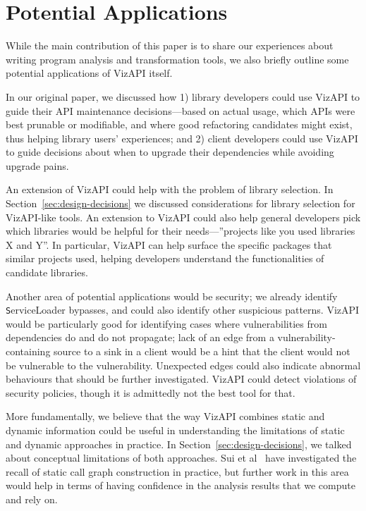 \section{Potential Applications}
\label{sec:potential-applications}
While the main contribution of this paper is to share our experiences
about writing program analysis and transformation tools, we also
briefly outline some potential applications of VizAPI itself.

In our original paper, we discussed how 1) library developers could
use VizAPI to guide their API maintenance decisions---based on actual
usage, which APIs were best prunable or modifiable, and where good
refactoring candidates might exist, thus helping library users'
experiences; and 2) client developers could use VizAPI to guide
decisions about when to upgrade their dependencies while avoiding
upgrade pains.

An extension of VizAPI could help with the problem of library selection. In
Section~\ref{sec:design-decisions} we discussed considerations for library
selection for VizAPI-like tools. An extension to VizAPI could also help
general developers pick which libraries would be helpful for their
needs---''projects like you used libraries X and Y''. In particular,
VizAPI can help surface the specific packages that similar projects used,
helping developers understand the functionalities of candidate libraries.


Another area of potential applications would be security; we already
identify {\texttt ServiceLoader} bypasses, and could also identify
other suspicious patterns. VizAPI would be particularly good for
identifying cases where vulnerabilities from dependencies do and do
not propagate; lack of an edge from a vulnerability-containing source
to a sink in a client would be a hint that the client would not be
vulnerable to the vulnerability. Unexpected edges could also indicate
abnormal behaviours that should be further investigated.
VizAPI could detect violations of
security policies, though it is admittedly not the best tool for that.

More fundamentally, we believe that the way VizAPI combines static and
dynamic information could be useful in understanding the limitations
of static and dynamic approaches in practice. In
Section~\ref{sec:design-decisions}, we talked about conceptual
limitations of both approaches. Sui et
al~\cite{sui20:_recal_static_call_graph_const_pract} have investigated
the recall of static call graph construction in practice, but further
work in this area would help in terms of having confidence in the
analysis results that we compute and rely on.

